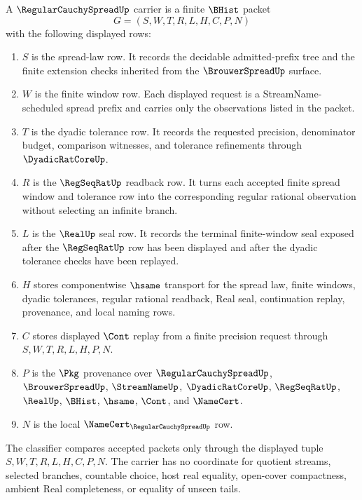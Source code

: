 \begin{definition}
\label{def:regular-cauchy-spread-carrier}
A $\RegularCauchySpreadUp$ carrier is a finite $\BHist$ packet
$$
G=(S,W,T,R,L,H,C,P,N)
$$
with the following displayed rows:
\begin{enumerate}
\item $S$ is the spread-law row. It records the decidable admitted-prefix tree and the finite extension checks inherited from the $\BrouwerSpreadUp$ surface.
\item $W$ is the finite window row. Each displayed request is a StreamName-scheduled spread prefix and carries only the observations listed in the packet.
\item $T$ is the dyadic tolerance row. It records the requested precision, denominator budget, comparison witnesses, and tolerance refinements through $\DyadicRatCoreUp$.
\item $R$ is the $\RegSeqRatUp$ readback row. It turns each accepted finite spread window and tolerance row into the corresponding regular rational observation without selecting an infinite branch.
\item $L$ is the $\RealUp$ seal row. It records the terminal finite-window seal exposed after the $\RegSeqRatUp$ row has been displayed and after the dyadic tolerance checks have been replayed.
\item $H$ stores componentwise $\hsame$ transport for the spread law, finite windows, dyadic tolerances, regular rational readback, Real seal, continuation replay, provenance, and local naming rows.
\item $C$ stores displayed $\Cont$ replay from a finite precision request through $S,W,T,R,L,H,P,N$.
\item $P$ is the $\Pkg$ provenance over $\RegularCauchySpreadUp$, $\BrouwerSpreadUp$, $\StreamNameUp$, $\DyadicRatCoreUp$, $\RegSeqRatUp$, $\RealUp$, $\BHist$, $\hsame$, $\Cont$, and $\NameCert$.
\item $N$ is the local $\NameCert_{\RegularCauchySpreadUp}$ row.
\end{enumerate}
The classifier compares accepted packets only through the displayed tuple $S,W,T,R,L,H,C,P,N$. The carrier has no coordinate for quotient streams, selected branches, countable choice, host real equality, open-cover compactness, ambient Real completeness, or equality of unseen tails.
\end{definition}

